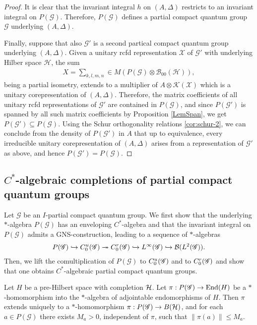 \begin{proof}
 It is clear that the invariant integral $h$ on $(A,\Delta)$ restricts to an invariant
integral on $P(\mathscr{G})$. Therefore, $P(\mathscr{G})$ defines a partial compact quantum group $\mathscr{G}$ underlying $(A,\Delta)$. 


Finally, suppose that also $\mathscr{G}'$ is a second partical compact quantum group underlying $(A,\Delta)$.   Given  a unitary rcfd representation $\mathscr{X}$ of $\mathscr{G}'$ with underlying Hilber space $\mathscr{H}$, the sum
\begin{align*}
  X=\sum_{k,l,m,n} \in M(P(\mathscr{G}) \otimes \mathcal{B}_{00}(\mathscr{H})),
\end{align*}
being a partial isometry, extends to a multiplier of $A \otimes \mathcal{K}(\mathscr{X})$ which is a unitary corepresentation of $(A,\Delta)$. Therefore, the matrix coefficients of all  unitary rcfd representations of $\mathscr{G}'$ are contained in $P(\mathscr{G})$, and since $P(\mathscr{G'})$ is spanned by all such matrix coefficients by Proposition \ref{LemSpan},  we get $P(\mathscr{G'}) \subseteq P(\mathscr{G})$. Using the Schur orthogonality relations \ref{cor:schur-2}, we can conclude from the density of $P(\mathscr{G'})$ in $A$ that up to equivalence, every  irreducible unitary corepresentation of $(A,\Delta)$ arises from a representation of  $\mathscr{G'}$ as above, and hence  $P(\mathscr{G'}) = P(\mathscr{G})$.
\end{proof}
\subsection{$C^{*}$-algebraic completions of partial compact quantum groups}


 Let $\mathscr{G}$ be an  $I$-partial compact quantum group. We  first show that the  underlying $*$-algebra $P(\mathscr{G})$  has an enveloping  $C^{*}$-algebra and that the invariant integral on $P(\mathscr{G})$ admits  a GNS-construction, leading to a sequence of  $*$-algebras
\begin{align*}
P(\mathscr{G}) \hookrightarrow C^{u}_{0}(\mathscr{G}) \twoheadrightarrow
  C^{r}_{0}(\mathscr{G})\hookrightarrow
L^{\infty}(\mathscr{G}) \hookrightarrow {\cal B}(L^{2}(\mathscr{G})).
\end{align*}
Then, we lift the comultiplication of $P(\mathscr{G})$ to $C^{u}_{0}(\mathscr{G})$ and to $C^{r}_{0}(\mathscr{G})$ and show that one obtains $C^{*}$-algebraic partial compact quantum groups.  

\begin{Lem}\label{LemUniBound}
 Let $H$ be a pre-Hilbert space with completion $\mathcal{H}$. Let $\pi: P(\mathscr{G})\rightarrow \operatorname{\mathrm{End}}(H)$ be a $*$-homomorphism into the $*$-algebra of adjointable endomorphisms of $H$. Then $\pi$ extends uniquely to a $*$-homomorphism $\pi: P(\mathscr{G})\rightarrow B(\mathcal{H})$, and for each $a\in P(\mathscr{G})$ there exists $M_a>0$, independent of $\pi$, such that $\|\pi(a)\|\leq M_a$.
\end{Lem} 

